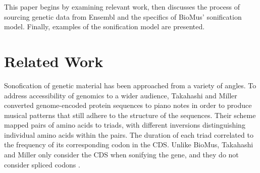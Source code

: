 \documentclass[letterpaper]{article}
\begin{document}





This paper begins by examining relevant work, then discusses the process of sourcing genetic data from Ensembl and the specifics of BioMus’ sonification model. Finally, examples of the sonification model are presented.

\section{Related Work}

Sonofication of genetic material has been approached from a variety of angles. To address accessibility of genomics to a wider audience, Takahashi and Miller converted genome-encoded protein sequences to piano notes in order to produce musical patterns that still adhere to the structure of the sequences. Their scheme mapped pairs of amino acids to triads, with different inversions distinguishing individual amino acids within the pairs. The duration of each triad correlated to the frequency of its corresponding codon in the CDS. Unlike BioMus, Takahashi and Miller only consider the CDS when sonifying the gene, and they do not consider spliced codons \cite{takahashi_miller_2007}. 
\end{document}
